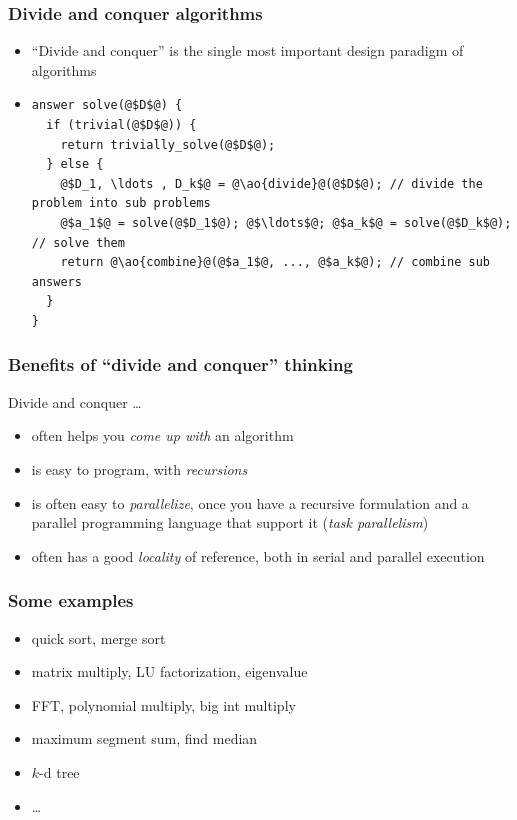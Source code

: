 \documentclass[12pt,dvipdfmx]{beamer}
\newcommand{\ao}[1]{{\color{blue}#1}}
\begin{document}
\begin{frame}[fragile]
\frametitle{Divide and conquer algorithms}
\begin{itemize}
\item ``Divide and conquer'' is the single
  most important design paradigm of algorithms
\item []
\begin{lstlisting}[basicstyle=\scriptsize]
answer solve(@$D$@) {
  if (trivial(@$D$@)) {
    return trivially_solve(@$D$@);
  } else {
    @$D_1, \ldots , D_k$@ = @\ao{divide}@(@$D$@); // divide the problem into sub problems
    @$a_1$@ = solve(@$D_1$@); @$\ldots$@; @$a_k$@ = solve(@$D_k$@); // solve them
    return @\ao{combine}@(@$a_1$@, ..., @$a_k$@); // combine sub answers
  }
}
\end{lstlisting}
\end{itemize}

\def\svgwidth{\textwidth}
{\tiny}

\end{frame}

\begin{frame}
\frametitle{Benefits of ``divide and conquer'' thinking}
Divide and conquer \ldots
\begin{itemize}
\item often helps you \ao{\em come up with} an algorithm

\item is easy to program, with \ao{\em recursions}

\item is often easy to \ao{\em parallelize}, once
  you have a recursive formulation
  and a parallel programming language that
  support it (\ao{\em task parallelism})

\item often has a good \ao{\em locality} of
  reference, both in serial and parallel execution
\end{itemize}
\end{frame}


\begin{frame}
\frametitle{Some examples}
\begin{itemize}
\item quick sort, merge sort
\item matrix multiply, LU factorization, eigenvalue
\item FFT, polynomial multiply, big int multiply
\item maximum segment sum, find median 
\item $k$-d tree
\item \ldots
\end{itemize}
\end{frame}
\end{document}
